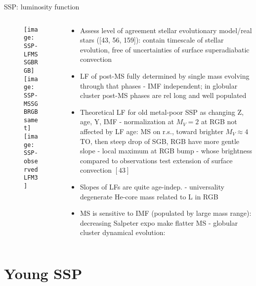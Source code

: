 \begin{frame}{SSP: luminosity function}
\begin{columns}[T]
	\begin{column}{0.35\textwidth}
		\begin{figure}[!ht]
			\texttt{[image: SSP-LFMSSGBRGB]}
			\texttt{[image: SSP-MSSGBRGBsamet]}
			\texttt{[image: SSP-observedLFM3]}
		\end{figure}
	\end{column}
	\begin{column}{0.65\textwidth}
		\begin{itemize}
			\item Assess level of agreement stellar evolutionary model/real stars ([43, 56, 159]): contain timescale of stellar evolution, free of uncertainties of surface superadiabatic convection
			\item LF of post-MS fully determined by single mass evolving through that phases - IMF independent; in globular cluster post-MS phases are rel long and well populated
			\item Theoretical LF for old metal-poor SSP as changing Z, age, Y, IMF - normalization at $M_V=2$ at RGB not affected by LF age: MS on r.s., toward brighter $M_V\approx4$ TO, then steep drop of SGB, RGB have more gentle slope - local maximum at RGB bump - whose brightness compared to observations test extension of surface convection $[43]$
			\item Slopes of LFs are quite age-indep. - universality \Pelectron degenerate He-core mass related to L in RGB
			\item MS is sensitive to IMF (populated by large mass range): decreasing Salpeter expo make flatter MS - globular cluster dynamical evolution: 
		\end{itemize}
	\end{column}
\end{columns}
\end{frame}

\section{Young SSP}

